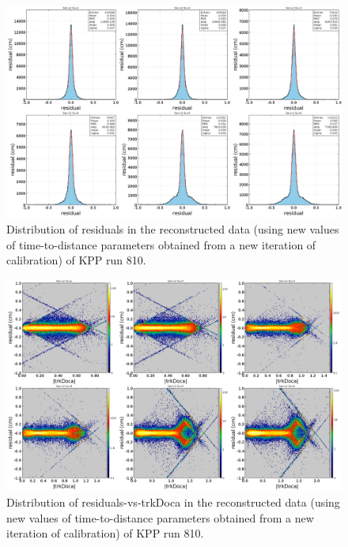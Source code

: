 \documentclass[12pt,epsfig]{article}
\begin{document}
\begin{figure}[H]
    \centering
    \includegraphics[width=1.0\textwidth]{Figures/residual_Iter2NwDef3T0nw5n.png}
    \caption{Distribution of residuals in the reconstructed data (using new values of time-to-distance parameters obtained from a new iteration of calibration) of KPP run 810.}
    \label{fResidualsDefAllSLiter1}
\end{figure}

\begin{figure}[H]
    \centering
    \includegraphics[width=1.0\textwidth]{Figures/residual_vs_doca_Iter2NwDef3T0nw5n.png}
    \caption{Distribution of residuals-vs-trkDoca in the reconstructed data (using new values of time-to-distance parameters obtained from a new iteration of calibration) of KPP run 810.}
    \label{fResidualsVsDocaDefAllSLiter1}
\end{figure}
\end{document}
